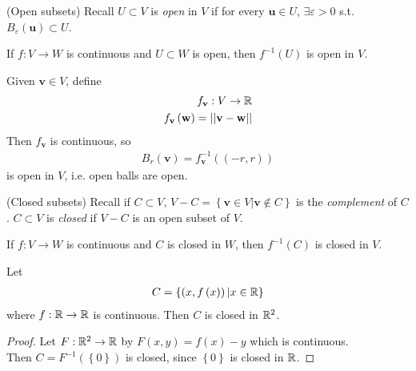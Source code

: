 \documentclass[a4paper]{article}
\begin{document}
\begin{defi} (Open subsets) Recall $U \subset V$ is \emph{open} in $V$ if for every $\mathbf{u} \in U$, $\exists \varepsilon > 0$ s.t. $B_\varepsilon\left(\mathbf{u}\right) \subset U$.
\end{defi}

\begin{prop}
If $f:V \to W$ is continuous and $U \subset W$ is open, then $f^{-1}\left(U\right)$ is open in $V$.
\begin{eg}
Given $\mathbf{v}\in V$, define
\begin{equation*}
\begin{aligned}
f_\mathbf{v}: V \to \mathbb{R}\\
f_\mathbf{v}\left(\mathbf{w}\right) = ||\mathbf{v}-\mathbf{w}||
\end{aligned}
\end{equation*}
Then $f_\mathbf{v}$ is continuous, so
\begin{equation*}
\begin{aligned}
B_r\left(\mathbf{v}\right) = f^{-1}_\mathbf{v} \left(\left(-r,r\right)\right)
\end{aligned}
\end{equation*}
is open in $V$, i.e. open balls are open.
\end{eg}
\end{prop}

\begin{defi} (Closed subsets) Recall if $C \subset V$, $V-C = \left\{\mathbf{v}\in V | \mathbf{v} \not \in C\right\}$ is the \emph{complement} of $C$. $C \subset V$ is \emph{closed} if $V-C$ is an open subset of $V$.
\end{defi}

\begin{coro}
If $f:V \to W$ is continuous and $C$ is closed in $W$, then $f^{-1}\left(C\right)$ is closed in $V$.
\end{coro}

\begin{eg}
Let
\begin{equation*}
\begin{aligned}
C = \left\{\left(x,f\left(x\right)\right) | x\in \mathbb{R}\right\}
\end{aligned}
\end{equation*}
where $f:\mathbb{R} \to \mathbb{R}$ is continuous. Then $C$ is closed in $\mathbb{R}^2$.
\begin{proof}
Let $F: \mathbb{R}^2 \to \mathbb{R}$ by $F\left(x,y\right) = f\left(x\right) - y$ which is continuous.\\
Then $C=F^{-1}\left(\left\{0\right\}\right)$ is closed, since $\left\{0\right\}$ is closed in $\mathbb{R}$.
\end{proof}
\end{eg}
\end{document}
